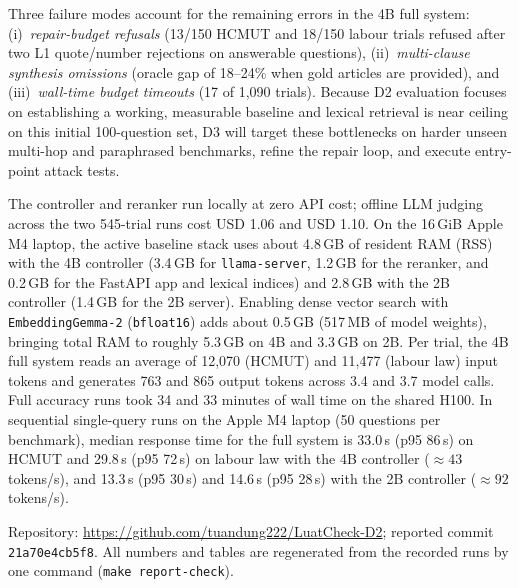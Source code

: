  Three failure modes account for the remaining errors in the 4B full system: (i)~\emph{repair-budget refusals} (13/150 HCMUT and 18/150 labour trials refused after two L1 quote/number rejections on answerable questions), (ii)~\emph{multi-clause synthesis omissions} (oracle gap of 18--24\% when gold articles are provided), and (iii)~\emph{wall-time budget timeouts} (17 of 1,090 trials). Because D2 evaluation focuses on establishing a working, measurable baseline and lexical retrieval is near ceiling on this initial 100-question set, D3 will target these bottlenecks on harder unseen multi-hop and paraphrased benchmarks, refine the repair loop, and execute entry-point attack tests.

 The controller and reranker run locally at zero API cost; offline LLM judging across the two 545-trial runs cost USD 1.06 and USD 1.10. On the 16\,GiB Apple M4 laptop, the active baseline stack uses about 4.8\,GB of resident RAM (RSS) with the 4B controller (3.4\,GB for \texttt{llama-server}, 1.2\,GB for the reranker, and 0.2\,GB for the FastAPI app and lexical indices) and 2.8\,GB with the 2B controller (1.4\,GB for the 2B server). Enabling dense vector search with \texttt{EmbeddingGemma-2} (\texttt{bfloat16}) adds about 0.5\,GB (517\,MB of model weights), bringing total RAM to roughly 5.3\,GB on 4B and 3.3\,GB on 2B. Per trial, the 4B full system reads an average of 12,070 (HCMUT) and 11,477 (labour law) input tokens and generates 763 and 865 output tokens across 3.4 and 3.7 model calls. Full accuracy runs took 34 and 33 minutes of wall time on the shared H100. In sequential single-query runs on the Apple M4 laptop (50 questions per benchmark), median response time for the full system is 33.0\,s (p95 86\,s) on HCMUT and 29.8\,s (p95 72\,s) on labour law with the 4B controller ($\approx 43$ tokens/s), and 13.3\,s (p95 30\,s) and 14.6\,s (p95 28\,s) with the 2B controller ($\approx 92$ tokens/s).

 Repository: \url{https://github.com/tuandung222/LuatCheck-D2}; reported commit \texttt{21a70e4cb5f8}. All numbers and tables are regenerated from the recorded runs by one command (\texttt{make report-check}).
